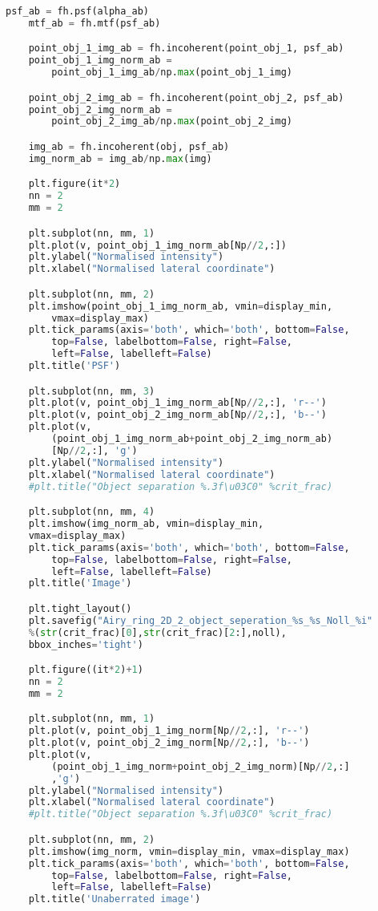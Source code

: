 \begin{lstlisting}[language=Python]
	psf_ab = fh.psf(alpha_ab)
	mtf_ab = fh.mtf(psf_ab)

	point_obj_1_img_ab = fh.incoherent(point_obj_1, psf_ab)
	point_obj_1_img_norm_ab = 
		point_obj_1_img_ab/np.max(point_obj_1_img)

	point_obj_2_img_ab = fh.incoherent(point_obj_2, psf_ab)
	point_obj_2_img_norm_ab = 
		point_obj_2_img_ab/np.max(point_obj_2_img)

	img_ab = fh.incoherent(obj, psf_ab)
	img_norm_ab = img_ab/np.max(img)

	plt.figure(it*2)
	nn = 2
	mm = 2

	plt.subplot(nn, mm, 1)
	plt.plot(v, point_obj_1_img_norm_ab[Np//2,:])
	plt.ylabel("Normalised intensity")
	plt.xlabel("Normalised lateral coordinate")

	plt.subplot(nn, mm, 2)
	plt.imshow(point_obj_1_img_norm_ab, vmin=display_min, 
		vmax=display_max)
	plt.tick_params(axis='both', which='both', bottom=False, 
		top=False, labelbottom=False, right=False, 
		left=False, labelleft=False)
	plt.title('PSF')

	plt.subplot(nn, mm, 3)
	plt.plot(v, point_obj_1_img_norm_ab[Np//2,:], 'r--')
	plt.plot(v, point_obj_2_img_norm_ab[Np//2,:], 'b--')
	plt.plot(v, 
		(point_obj_1_img_norm_ab+point_obj_2_img_norm_ab)
		[Np//2,:], 'g')
	plt.ylabel("Normalised intensity")
	plt.xlabel("Normalised lateral coordinate")
	#plt.title("Object separation %.3f\u03C0" %crit_frac)

	plt.subplot(nn, mm, 4)
	plt.imshow(img_norm_ab, vmin=display_min, 
	vmax=display_max)
	plt.tick_params(axis='both', which='both', bottom=False, 
		top=False, labelbottom=False, right=False, 
		left=False, labelleft=False)
	plt.title('Image')

	plt.tight_layout()
	plt.savefig("Airy_ring_2D_2_object_seperation_%s_%s_Noll_%i" 
	%(str(crit_frac)[0],str(crit_frac)[2:],noll), 
	bbox_inches='tight')

	plt.figure((it*2)+1)
	nn = 2
	mm = 2

	plt.subplot(nn, mm, 1)
	plt.plot(v, point_obj_1_img_norm[Np//2,:], 'r--')
	plt.plot(v, point_obj_2_img_norm[Np//2,:], 'b--')
	plt.plot(v, 
		(point_obj_1_img_norm+point_obj_2_img_norm)[Np//2,:]
		,'g')
	plt.ylabel("Normalised intensity")
	plt.xlabel("Normalised lateral coordinate")
	#plt.title("Object separation %.3f\u03C0" %crit_frac)

	plt.subplot(nn, mm, 2)
	plt.imshow(img_norm, vmin=display_min, vmax=display_max)
	plt.tick_params(axis='both', which='both', bottom=False, 
		top=False, labelbottom=False, right=False, 
		left=False, labelleft=False)
	plt.title('Unaberrated image')


\end{lstlisting}
